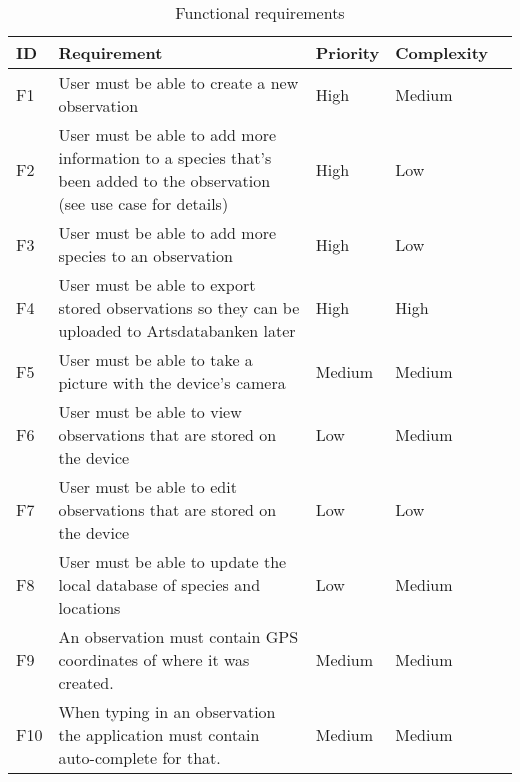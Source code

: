 \begin{table}[h!]
	\begin{tabular}[t]{|l|p{}|l|l|p{}|}\hline
	\bf ID&\bf Requirement& \bf Priority& \bf Complexity\\\hline
	F1&User must be able to create a new observation &High&Medium\\\hline
	F2&User must be able to add more information to a species that's been added to the observation (see use case for details) 	&High&Low\\\hline
	F3&User must be able to add more species to an observation &High&Low\\\hline
	F4&User must be able to export stored observations so they can be uploaded to Artsdatabanken later &High&High\\\hline
	F5&User must be able to take a picture with the device's camera &Medium&Medium\\\hline
	F6&User must be able to view observations that are stored on the device &Low&Medium\\\hline
	F7&User must be able to edit observations that are stored on the device &Low&Low\\\hline
	F8&User must be able to update the local database of species and locations &Low&Medium\\\hline
	F9&An observation must contain GPS coordinates of where it was created. &Medium&Medium\\\hline
	F10&When typing in an observation the application must contain auto-complete for that. &Medium&Medium\\\hline
	\end{tabular}
	\caption{Functional requirements}
	\label{funcreqs}
\end{table}
